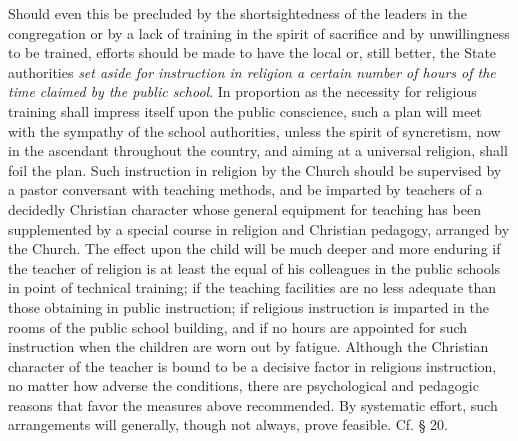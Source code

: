Should even this be precluded by the shortsightedness of the leaders in the congregation or by a lack of training in the spirit of sacrifice and by unwillingness to be trained, efforts should be made to have the local or, still better, the State authorities \emph{set aside for instruction in religion a certain number of hours of the time claimed by the public school}. In proportion as the necessity for religious training shall impress itself upon the public conscience, such a plan will meet with the sympathy of the school authorities, unless the spirit of syncretism, now in the ascendant throughout the country, and aiming at a universal religion, shall foil the plan. Such instruction in religion by the Church should be supervised by a pastor conversant with teaching methods, and be imparted by teachers of a decidedly Christian character whose general equipment for teaching has been supplemented by a special course in religion and Christian pedagogy, arranged by the Church. The effect upon the child will be much deeper and more enduring if the teacher of religion is at least the equal of his colleagues in the public schools in point of technical training; if the teaching facilities are no less adequate than those obtaining in public instruction; if religious instruction is imparted in the rooms of the public school building, and if no hours are appointed for such instruction when the children are worn out by fatigue. Although the Christian character of the teacher is bound to be a decisive factor in religious instruction, no matter how adverse the conditions, there are psychological and pedagogic reasons that favor the measures above recommended. By
systematic effort, such arrangements will generally, though not always, prove feasible. Cf. § 20.

